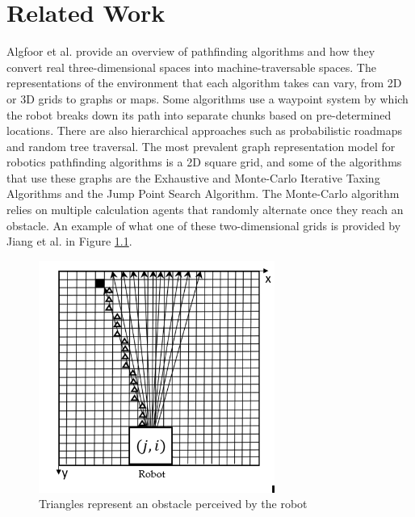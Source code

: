\chapter{Related Work} 
\label{ch:relatedwork}


Algfoor et al. \cite{abd2015comprehensive} provide an overview of pathfinding algorithms and how they convert real three-dimensional spaces into machine-traversable spaces. The representations of the environment that each algorithm takes can vary, from 2D or 3D grids to graphs or maps. Some algorithms use a waypoint system by which the robot breaks down its path into separate chunks based on pre-determined locations. There are also hierarchical approaches such as probabilistic roadmaps and random tree traversal. The most prevalent graph representation model for robotics pathfinding algorithms is a 2D square grid, and some of the algorithms that use these graphs are the Exhaustive and Monte-Carlo Iterative Taxing Algorithms and the Jump Point Search Algorithm. The Monte-Carlo algorithm relies on multiple calculation agents that randomly alternate once they reach an obstacle. An example of what one of these two-dimensional grids is provided by Jiang et al.\cite{jiang2018eight} in Figure \ref{fig:Environment}.
\begin{figure}[H]
    \centering
    \includegraphics{images/EnvironmentRepresentation.PNG}
    \caption{Triangles represent an obstacle perceived by the robot}
    \label{fig:Environment}
\end{figure}
